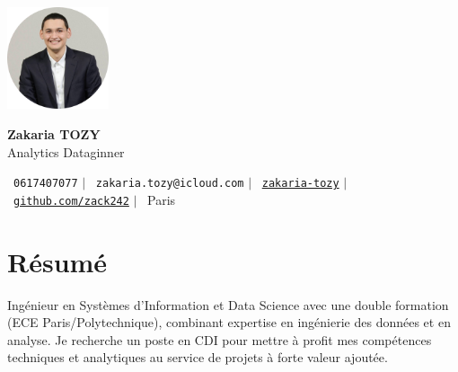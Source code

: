 \documentclass[11pt,a4paper]{article}
\begin{document}
\begin{flushleft}
  \begin{minipage}[c]{0.2\textwidth}
    \includegraphics[width=3cm]{images/profilpicture.png}
  \end{minipage}%
  \begin{minipage}[c]{0.8\textwidth}
    \hspace{10pt}
    {\huge \textbf{Zakaria TOZY}} \\ \vspace{10pt}
    \hspace{9pt}
    {\normalsize Analytics Dataginner} \vspace{2pt}
  \end{minipage}
\end{flushleft}

\vspace{-5pt}

\begin{center}
    \small \faPhone\ \texttt{0617407077} \hspace{1pt} $|$
    \hspace{1pt} \faEnvelope\ \texttt{zakaria.tozy@icloud.com} \hspace{1pt} $|$
    \hspace{1pt} \faLinkedin\ \href{https://linkedin.com/in/zakaria-tozy}{\texttt{zakaria-tozy}} \hspace{1pt} $|$
    \hspace{1pt} \faGithub\ \href{https://github.com/zack242}{\texttt{github.com/zack242}} \hspace{1pt} $|$
    \hspace{1pt} \faMapMarker\ Paris
\end{center}

\vspace{10pt}
\section{Résumé}
Ingénieur en Systèmes d'Information et Data Science avec une double formation (ECE Paris/Polytechnique), combinant expertise en ingénierie des données et en analyse. Je recherche un poste en CDI pour mettre à profit mes compétences techniques et analytiques au service de projets à forte valeur ajoutée.
\end{document}
